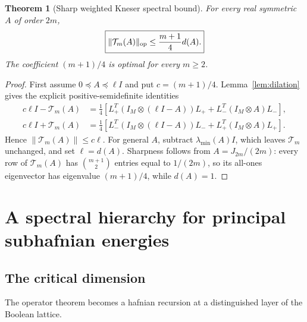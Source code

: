 \documentclass[11pt]{article}
\newtheorem{theorem}{Theorem}
\theoremstyle{remark}\newtheorem{remark}[theorem]{Remark}
\begin{document}
\begin{theorem}[Sharp weighted Kneser spectral bound]\label{thm:operator}
For every real symmetric $A$ of order $2m$,
\begin{equation}\label{eq:operatorbound}
\boxed{
\|\mathcal T_m(A)\|_{\mathrm{op}}\le\frac{m+1}{4}d(A).
}
\end{equation}
The coefficient $(m+1)/4$ is optimal for every $m\ge2$.
\end{theorem}
\begin{proof}
First assume $0\preceq A\preceq\ell I$ and put $c=(m+1)/4$.
Lemma~\ref{lem:dilation} gives the explicit positive-semidefinite identities
\begin{align}
c\ell I-\mathcal T_m(A)
&=\tfrac14\left[L_+^T(I_M\otimes(\ell I-A))L_+
+L_-^T(I_M\otimes A)L_-\right],\label{eq:minus}\\
c\ell I+\mathcal T_m(A)
&=\tfrac14\left[L_-^T(I_M\otimes(\ell I-A))L_-
+L_+^T(I_M\otimes A)L_+\right].\label{eq:plus}
\end{align}
Hence $\|\mathcal T_m(A)\|\le c\ell$.  For general $A$, subtract
$\lambda_{\min}(A)I$, which leaves $\mathcal T_m$ unchanged, and set
$\ell=d(A)$.  Sharpness follows from $A=J_{2m}/(2m)$: every row of
$\mathcal T_m(A)$ has $\binom{m+1}{2}$ entries equal to $1/(2m)$, so its
all-ones eigenvector has eigenvalue $(m+1)/4$, while $d(A)=1$.
\end{proof}

\section{A spectral hierarchy for principal subhafnian energies}
\subsection{The critical dimension}
The operator theorem becomes a hafnian recursion at a distinguished layer of
the Boolean lattice.
\end{document}
